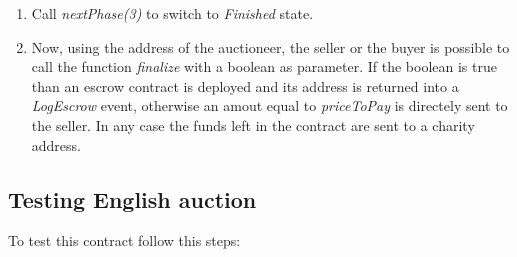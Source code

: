 \documentclass{article}
\begin{document}
\begin{itemize}
\begin{enumerate}
        \item Call \textit{nextPhase(3)} to switch to \textit{Finished} state. 
        \item Now, using the address of the auctioneer, the seller or the buyer is possible to call the function \textit{finalize} with a boolean as parameter. If the boolean is true than an escrow contract is deployed and its address is returned into a \textit{LogEscrow} event, otherwise an amout equal to \textit{priceToPay} is directely sent to the seller. In any case the funds left in the contract are sent to a charity address.
    \end{enumerate}
\end{itemize}
\subsection{Testing English auction}
To test this contract follow this steps:
\end{document}
